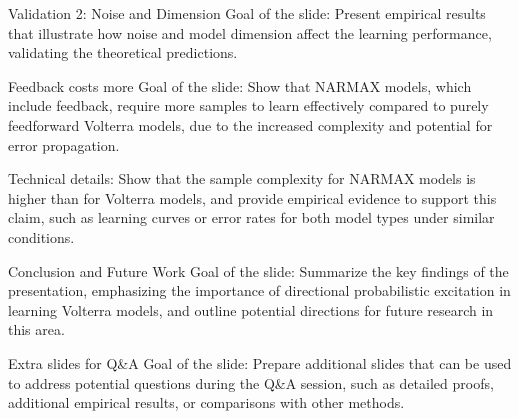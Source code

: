 \documentclass[aspectratio=169, notheorems, 10pt]{beamer}
\begin{document}
\begin{frame}{Validation 2: Noise and Dimension}
    Goal of the slide: Present empirical results that illustrate how noise and model dimension affect the learning performance, validating the theoretical predictions.
\end{frame}

\begin{frame}{Feedback costs more}
    Goal of the slide: Show that NARMAX models, which include feedback, require more samples to learn effectively compared to purely feedforward Volterra models, due to the increased complexity and potential for error propagation.

    Technical details: Show that the sample complexity for NARMAX models is higher than for Volterra models, and provide empirical evidence to support this claim, such as learning curves or error rates for both model types under similar conditions.
\end{frame}

\begin{frame}{Conclusion and Future Work}
    Goal of the slide: Summarize the key findings of the presentation, emphasizing the importance of directional probabilistic excitation in learning Volterra models, and outline potential directions for future research in this area.
\end{frame}        

\begin{frame}{Extra slides for Q\&A}
    Goal of the slide: Prepare additional slides that can be used to address potential questions during the Q\&A session, such as detailed proofs, additional empirical results, or comparisons with other methods.
\end{frame}

\end{document}
